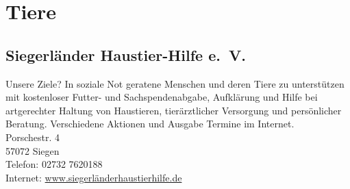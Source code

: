 \chapter{Tiere}

\section{Siegerländer Haustier-Hilfe e.~V.}
Unsere Ziele? In soziale Not geratene Menschen und deren Tiere zu unterstützen mit kostenloser Futter- und Sachspendenabgabe, Aufklärung und Hilfe bei artgerechter Haltung von Haustieren, tierärztlicher Versorgung und persönlicher Beratung. Verschiedene Aktionen und Ausgabe Termine im Internet.\\

Porschestr. 4\\
57072 Siegen\\  
Telefon: 02732 7620188 \\ 
Internet: \href{www.siegerländerhaustierhilfe.de}{www.siegerländerhaustierhilfe.de}
   
